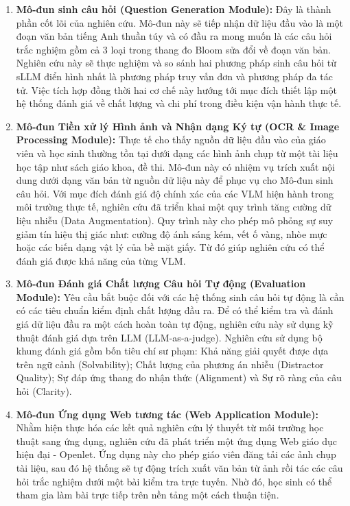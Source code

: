 \begin{enumerate}
    \item \textbf{Mô-đun sinh câu hỏi (Question Generation Module):} Đây là thành phần cốt lõi của nghiên cứu. Mô-đun này sẽ tiếp nhận dữ liệu đầu vào là một đoạn văn bản tiếng Anh thuần túy và có đầu ra mong muốn là các câu hỏi trắc nghiệm gồm cả 3 loại trong thang đo Bloom sửa đổi về đoạn văn bản. Nghiên cứu này sẽ thực nghiệm và so sánh hai phương pháp sinh câu hỏi từ sLLM điển hình nhất là phương pháp truy vấn đơn và phương pháp đa tác tử. Việc tích hợp đồng thời hai cơ chế này hướng tới mục đích thiết lập một hệ thống đánh giá về chất lượng và chi phí trong điều kiện vận hành thực tế.

    \item \textbf{Mô-đun Tiền xử lý Hình ảnh và Nhận dạng Ký tự (OCR \& Image Processing Module):} Thực tế cho thấy nguồn dữ liệu đầu vào của giáo viên và học sinh thường tồn tại dưới dạng các hình ảnh chụp từ một tài liệu học tập như sách giáo khoa, đề thi. Mô-đun này có nhiệm vụ trích xuất nội dung dưới dạng văn bản từ nguồn dữ liệu này để phục vụ cho Mô-đun sinh câu hỏi. Với mục đích đánh giá độ chính xác của các VLM hiện hành trong môi trường thực tế, nghiên cứu đã triển khai một quy trình tăng cường dữ liệu nhiễu (Data Augmentation). Quy trình này cho phép mô phỏng sự suy giảm tín hiệu thị giác như: cường độ ánh sáng kém, vết ố vàng, nhòe mực hoặc các biến dạng vật lý của bề mặt giấy. Từ đó giúp nghiên cứu có thể đánh giá được khả năng của từng VLM.

    \item \textbf{Mô-đun Đánh giá Chất lượng Câu hỏi Tự động (Evaluation Module):} Yêu cầu bắt buộc đối với các hệ thống sinh câu hỏi tự động là cần có các tiêu chuẩn kiểm định chất lượng đầu ra. Để có thể kiểm tra và đánh giá dữ liệu đầu ra một cách hoàn toàn tự động, nghiên cứu này sử dụng kỹ thuật đánh giá dựa trên LLM (LLM-as-a-judge). Nghiên cứu sử dụng bộ khung đánh giá gồm bốn tiêu chí sư phạm: Khả năng giải quyết được dựa trên ngữ cảnh (Solvability); Chất lượng của phương án nhiễu (Distractor Quality); Sự đáp ứng thang đo nhận thức (Alignment) và Sự rõ ràng của câu hỏi (Clarity).

    \item \textbf{Mô-đun Ứng dụng Web tương tác (Web Application Module):} Nhằm hiện thực hóa các kết quả nghiên cứu lý thuyết từ môi trường học thuật sang ứng dụng, nghiên cứu đã phát triển một ứng dụng Web giáo dục hiện đại - Openlet. Ứng dụng này cho phép giáo viên đăng tải các ảnh chụp tài liệu, sau đó hệ thống sẽ tự động trích xuất văn bản từ ảnh rồi tác các câu hỏi trắc nghiệm dưới một bài kiểm tra trực tuyến. Nhờ đó, học sinh có thể tham gia làm bài trực tiếp trên nền tảng một cách thuận tiện.

\end{enumerate}

